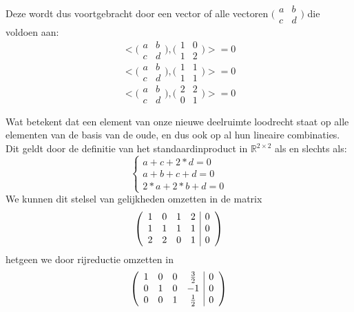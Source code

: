 \documentclass[lineaire_algebra_oplossingen.tex]{subfiles}
\begin{document}
Deze wordt dus voortgebracht door een vector of alle vectoren $\bigl(\begin{smallmatrix}
a & b \\
c & d
\end{smallmatrix}\bigr)$ die voldoen aan:
\[ <\bigl(\begin{smallmatrix}
a & b \\
c & d
\end{smallmatrix}\bigr),\bigl(\begin{smallmatrix}
1 & 0 \\
1 & 2
\end{smallmatrix}\bigr)> = 0\]
\[ <\bigl(\begin{smallmatrix}
a & b \\
c & d
\end{smallmatrix}\bigr),\bigl(\begin{smallmatrix}
1 & 1 \\
1 & 1
\end{smallmatrix}\bigr)> = 0\]
\[ <\bigl(\begin{smallmatrix}
a & b \\
c & d
\end{smallmatrix}\bigr),\bigl(\begin{smallmatrix}
2 & 2 \\
0 & 1
\end{smallmatrix}\bigr)> = 0\]

Wat betekent dat een element van onze nieuwe deelruimte loodrecht staat op alle elementen van de basis van de oude, en dus ook op al hun lineaire combinaties. Dit geldt door de definitie van het standaardinproduct in $\mathbb{R}^{2\times2}$ als en slechts als:
\[\left\{
\begin{array}{l}
a+c+2*d=0\\
a+b+c+d=0\\
2*a+2*b+d=0
\end{array} \right.\]
We kunnen dit stelsel van gelijkheden omzetten in de matrix
\[\left(
\begin{array}{c c c c | c}
1 & 0 & 1 & 2 & 0\\
1 & 1 & 1 & 1 & 0\\
2 & 2 & 0 & 1 & 0
\end{array}
\right)\]
hetgeen we door rijreductie omzetten in
\[\left(
\begin{array}{c c c c | c}
1 & 0 & 0 & \frac{3}{2} & 0\\
0 & 1 & 0 & -1 & 0\\
0 & 0 & 1 & \frac{1}{2} & 0
\end{array}
\right)\]
\end{document}
